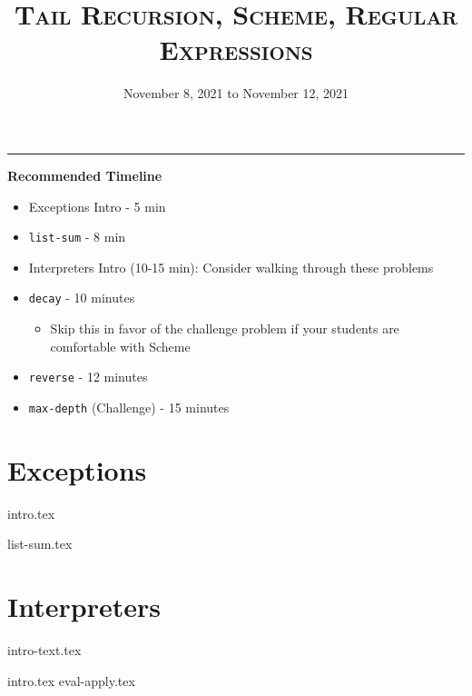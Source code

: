 \documentclass{exam}
\title{\textsc{Tail Recursion, Scheme, Regular Expressions}}
\date{November 8, 2021 to November 12, 2021}
\begin{document}
\maketitle
\rule{\textwidth}{0.15em}
\fontsize{12}{15}\selectfont

\begin{guide}
\begin{blocksection}
    \textbf{Recommended Timeline}
    \begin{itemize}
  	\item Exceptions Intro - 5 min
        \item \lstinline{list-sum} - 8 min
  	\item Interpreters Intro (10-15 min): Consider walking through these problems
        \item \lstinline{decay} - 10 minutes
        \begin{itemize}
            \item Skip this in favor of the challenge problem if your students are comfortable with Scheme
        \end{itemize}
        \item \lstinline{reverse} - 12 minutes
        \item \lstinline{max-depth} (Challenge) - 15 minutes
    \end{itemize}
\end{blocksection}
\newpage
\end{guide}



\newpage
\section{Exceptions}
{intro.tex}
\begin{questions}
{list-sum.tex}
\end{questions}

\newpage
\section{Interpreters}
{intro-text.tex}
\begin{questions}
{intro.tex}
{eval-apply.tex}
\end{questions}
\end{document}
